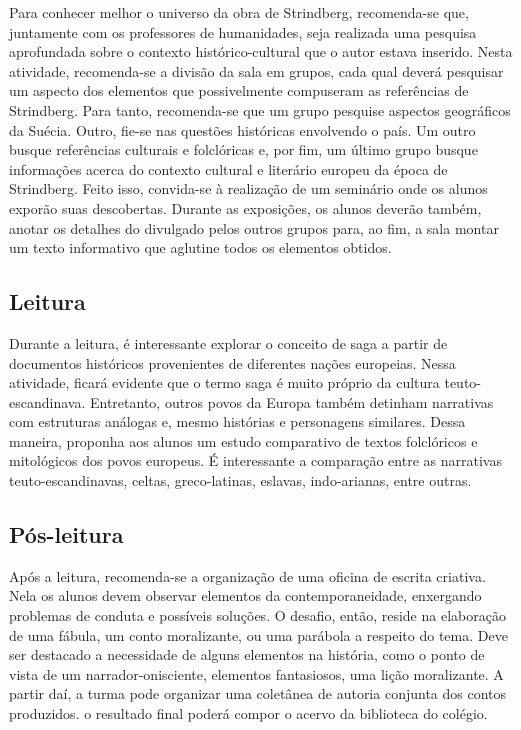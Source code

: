 \documentclass{extarticle}
\begin{document}
Para conhecer melhor o universo da obra de Strindberg,
recomenda-se que, juntamente com os professores de humanidades, seja
realizada uma pesquisa aprofundada sobre o contexto histórico-cultural
que o autor estava inserido. Nesta atividade, recomenda-se a divisão da
sala em grupos, cada qual deverá pesquisar um aspecto dos elementos que
possivelmente compuseram as referências de Strindberg. Para tanto,
recomenda-se que um grupo pesquise aspectos geográficos da Suécia.
Outro, fie-se nas questões históricas envolvendo o país. Um outro busque
referências culturais e folclóricas e, por fim, um último grupo busque
informações acerca do contexto cultural e literário europeu da época de
Strindberg. Feito isso, convida-se à realização de um seminário onde os
alunos exporão suas descobertas. Durante as exposições, os alunos
deverão também, anotar os detalhes do divulgado pelos outros grupos
para, ao fim, a sala montar um texto informativo que aglutine todos os
elementos obtidos.

\subsection{Leitura}

Durante a leitura, é interessante explorar o conceito de saga a
partir de documentos históricos provenientes de diferentes nações
europeias. Nessa atividade, ficará evidente que o termo saga é muito
próprio da cultura teuto-escandinava. Entretanto, outros povos da Europa
também detinham narrativas com estruturas análogas e, mesmo histórias e
personagens similares. Dessa maneira, proponha aos alunos um estudo
comparativo de textos folclóricos e mitológicos dos povos europeus. É
interessante a comparação entre as narrativas teuto-escandinavas,
celtas, greco-latinas, eslavas, indo-arianas, entre outras.

\subsection{Pós-leitura}

Após a leitura, recomenda-se a organização de uma oficina de
escrita criativa. Nela os alunos devem observar elementos da
contemporaneidade, enxergando problemas de conduta e possíveis soluções.
O desafio, então, reside na elaboração de uma fábula, um conto
moralizante, ou uma parábola a respeito do tema. Deve ser destacado a
necessidade de alguns elementos na história, como o ponto de vista de um
narrador-onisciente, elementos fantasiosos, uma lição moralizante. A
partir daí, a turma pode organizar uma coletânea de autoria conjunta dos
contos produzidos. o resultado final poderá compor o acervo da
biblioteca do colégio.
\end{document}

